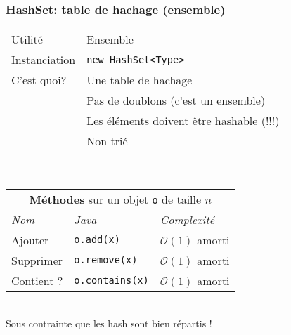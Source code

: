\documentclass[8pt,aspectratio=169]{beamer}
\begin{document}
\begin{frame}
\frametitle{HashSet: table de hachage (ensemble)}
\centering
\begin{tabular}{ll}
	Utilité & Ensemble\\
	Instanciation & \texttt{new HashSet<Type>}\\
	C'est quoi? & Une table de hachage\\
	& \color{red} Pas de doublons (c'est un ensemble)\\
	& \color{red} Les éléments doivent être hashable (!!!)\\
	& \color{red} Non trié
	
\end{tabular}\\
\vspace{0.5cm}
\centering
\begin{tabular}{lll}
	\multicolumn{3}{c}{\textbf{Méthodes} sur un objet \texttt{o} de taille $n$} \\
	\textit{Nom} & \textit{Java} & \textit{Complexité} \\
	Ajouter & \texttt{o.add(x)} & $\mathcal{O}(1)$ \color{orange} amorti\\
	Supprimer & \texttt{o.remove(x)} & $\mathcal{O}(1)$ \color{orange} amorti\\
	Contient ? & \texttt{o.contains(x)} & $\mathcal{O}(1)$ \color{orange} amorti\\
\end{tabular}\\
\vspace{0.5cm}
\color{blue} Sous contrainte que les hash sont bien répartis !
\end{frame}
\end{document}
